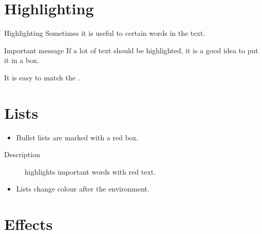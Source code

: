 \documentclass[aspectratio=169]{beamer}
\begin{document}
\section{Highlighting}


\begin{frame}{Highlighting}
    Sometimes it is useful to  certain words in the text.

    \begin{alertblock}{Important message}
        If a lot of text should be \alert{highlighted}, it is a good idea to put it in a box.
    \end{alertblock}
    

    It is easy to match the .
\end{frame}


\section{Lists}


\begin{frame}
    \begin{itemize}
        \item
        Bullet lists are marked with a red box.
    \end{itemize}


    \begin{description}
        \item[Description] highlights important words with red text.
    \end{description}


    \begin{example}
        \begin{itemize}
            \item
            Lists change colour after the environment.
        \end{itemize}
    \end{example}
\end{frame}


\section{Effects}
\end{document}
